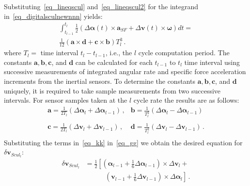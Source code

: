 \documentclass[journal]{IEEEtran}
\begin{document}
Substituting~\eqref{eq_lineqscul} and~\eqref{eq_lineqscul2} for the integrand in~\eqref{eq_digitalsculnewnnn} yields:
\begin{equation}\label{eq_gg}
\begin{split}
\int_{t_{l-1}}^{t_l}\frac{1}{2}  \left(\Delta\boldsymbol{\alpha}(t)\times \boldsymbol{a}_{SF} +\Delta\boldsymbol{v}(t)\times \boldsymbol{\omega}\right)dt=\\ \frac{1}{12}\left(\boldsymbol{a} \times \boldsymbol{d} + \boldsymbol{c} \times \boldsymbol{b}  \right)T_{l}^{3}\,.
\end{split}
\end{equation}
where $T_l = $ time interval $t_l - t_{l-1}$, i.e., the $l$ cycle computation period. The constants $\boldsymbol{a}, \boldsymbol{b}, \boldsymbol{c}$, and  $\boldsymbol{d}$ can be calculated for each $t_{l-1}$ to $t_l$ time interval using successive measurements of integrated angular rate and specific force acceleration increments from the inertial sensors. To determine the constants $\boldsymbol{a}, \boldsymbol{b}, \boldsymbol{c}$,  and $\boldsymbol{d}$ uniquely, it is required to take sample measurements from two successive intervals. For sensor samples taken at the $l$ cycle rate the results are as follows:
\begin{equation}\label{eq_kk}
\begin{array}{cl}
\boldsymbol{a} = \frac{1}{2T_l}\left(\Delta\boldsymbol{\alpha}_l+\Delta\boldsymbol{\alpha}_{l-1} \right)\,, & \boldsymbol{b} = \frac{1}{T_l^2}\left(\Delta\boldsymbol{\alpha}_l-\Delta\boldsymbol{\alpha}_{l-1} \right)\\
\\
\boldsymbol{c} = \frac{1}{2T_l}\left(\Delta\boldsymbol{v}_l +\Delta\boldsymbol{v}_{l-1} \right)\,, & \boldsymbol{d} = \frac{1}{T_l^2}\left(\Delta\boldsymbol{v}_l-\Delta\boldsymbol{v}_{l-1}  \right)\,.\\
\end{array}
\end{equation}
Substituting the terms in~\eqref{eq_kk} in~\eqref{eq_gg} we obtain the desired equation for $\delta\boldsymbol{v}_{Scul_l}$:
\begin{equation}\label{eq_jk}
 \begin{split}
  \delta\boldsymbol{v}_{Scul_l} &=\frac{1}{2}\left[\left( \boldsymbol{\alpha}_{l-1}+ \frac{1}{6}\Delta\boldsymbol{\alpha}_{l-1}\right) \times \Delta\boldsymbol{v}_l  +\right. \\
 &\left.\phantom{==[}\left(\boldsymbol{v}_{l-1} +\frac{1}{6}\Delta\boldsymbol{v}_{l-1} \right)\times\Delta\boldsymbol{\alpha}_l \right]\,.
 \end{split}
\end{equation}
\end{document}
